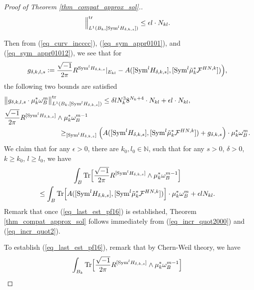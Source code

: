 \documentclass[12pt]{article}
\numberwithin{equation}{section}
\theoremstyle{theorem}
\theoremstyle{definition}
\theoremstyle{remark}
\newcommand{\imun} {\sqrt{-1}}
\newcommand{\nat}{\mathbb{N}}
\begin{document}
\begin{proof}[Proof of Theorem \ref{thm_compat_approx_sol}.]
\begin{multline}
			\Big\|_{L^1(B_k, [{\rm{Sym}}^l H_{\delta, k, s}])}^{{\rm{tr}}}
			\leq
			\epsilon l
			\cdot
			N_{kl}.
		\end{multline}
		\par 
		Then from (\ref{eq_curv_incccc}), (\ref{eq_sym_appr0101}), and (\ref{eq_sym_appr01012}), we see that for
		\begin{equation}
			g_{\delta, k, l, s} :=
			\frac{\imun}{2 \pi} R^{{\rm{Sym}}^l H_{\delta, k, s}}|_{E_{kl}}
			-
			A( [{\rm{Sym}}^l H_{\delta, k, s}], [ {\rm{Sym}}^l \tilde{\mu}_k^* \mathcal{F}^{HN, k}]) \Big),
		\end{equation}
		the following two bounds are satisfied
		\begin{align}
			& \big\| g_{\delta, k, l, s} \cdot \mu_k^* \omega_B^m \big\|_{L^1(B_k, [{\rm{Sym}}^l H_{\delta, k, s}])}^{{\rm{tr}}} \leq \delta l N_k^3 8^{N_k + 4} \cdot N_{kl} + \epsilon l \cdot N_{kl},
			\label{eq_incr_quot2000}
			\\
			\nonumber
			& \frac{\imun}{2 \pi} R^{[{\rm{Sym}}^l H_{\delta, k, s}]} \wedge \mu_k^* \omega_B^{m - 1}
			\\
			& 
			\qquad \qquad \qquad \qquad
			\label{eq_incr_quot2}
			\geq_{[{\rm{Sym}}^l H_{\delta, k, s}]}
			\Big(
			A( [{\rm{Sym}}^l H_{\delta, k, s}], [ {\rm{Sym}}^l \tilde{\mu}_k^* \mathcal{F}^{HN, k}])
			+ 
			g_{\delta, k, s}  \Big) \cdot \mu_k^* \omega_B^m.
		\end{align}
		We claim that for any $\epsilon > 0$, there are $k_0, l_0 \in \nat$, such that for any $s > 0$, $\delta > 0$, $k \geq k_0$, $l \geq l_0$, we have
		\begin{multline}\label{eq_last_est_pf16}
			\int_B {\rm{Tr}} \Big[ \frac{\imun}{2 \pi} R^{[{\rm{Sym}}^l H_{\delta, k, s}]} \wedge \mu_k^* \omega_B^{m - 1} \Big] 
			\\
			\leq
			\int_B {\rm{Tr}} \Big[ A( [{\rm{Sym}}^l H_{\delta, k, s}], [ {\rm{Sym}}^l \tilde{\mu}_k^* \mathcal{F}^{HN, k}]) \Big] \cdot \mu_k^* \omega_B^m 
			+
			\epsilon l N_{kl}.
		\end{multline}
		Remark that once (\ref{eq_last_est_pf16}) is established, Theorem \ref{thm_compat_approx_sol} follows immediately from (\ref{eq_incr_quot2000}) and (\ref{eq_incr_quot2}).
		\par 
		To establish (\ref{eq_last_est_pf16}), remark that by Chern-Weil theory, we have
		\begin{equation}\label{eq_last_est_pf12}
			\int_{B_k} {\rm{Tr}} \Big[ \frac{\imun}{2 \pi} R^{[{\rm{Sym}}^l H_{\delta, k, s}]} \wedge \mu_k^* \omega_B^{m - 1} \Big]

\end{equation}
\end{proof}
\end{document}
